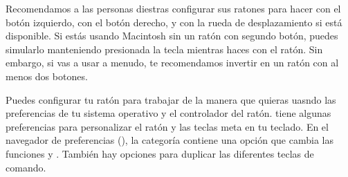 \documentclass[a4paper,10pt,twoside]{book}
\begin{document}





Recomendamos a las personas diestras configurar sus ratones para hacer \click con el bot\'on izquierdo, \actclick con el bot\'on derecho, y \metaclick con la rueda de desplazamiento si est\'a disponible.
Si est\'as usando Macintosh sin un rat\'on con segundo bot\'on, puedes simularlo manteniendo presionada la tecla \clover{} mientras haces \click con el rat\'on. Sin embargo, si vas a usar \pharo a menudo, te recomendamos invertir en un rat\'on con al menos dos botones.

Puedes configurar tu rat\'on para trabajar de la manera que quieras uasndo las preferencias de tu sistema operativo y el controlador del rat\'on.
\pharo tiene algunas preferencias para personalizar el rat\'on y las teclas meta en tu teclado.
En el navegador de preferencias (), la categor\'ia  contiene una opci\'on  que cambia las funciones \actclick y \metaclick.
Tambi\'en hay opciones para duplicar las diferentes teclas de comando.
\end{document}

